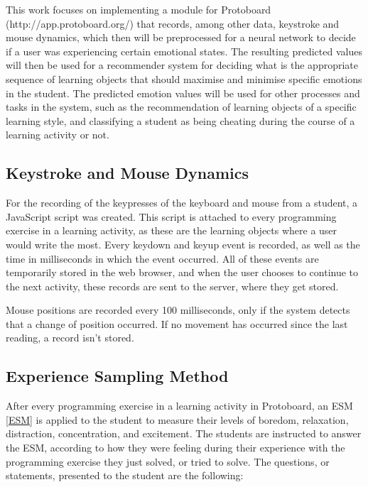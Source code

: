 \documentclass{acm_proc_article-sp}
\begin{document}
This work focuses on implementing a module for Protoboard (http://app.protoboard.org/) that
records, among other data, keystroke and mouse dynamics, which then
will be preprocessed for a neural network to decide if a user was
experiencing certain emotional states. The resulting predicted values
will then be used for a recommender system for deciding what is the
appropriate sequence of learning objects that should maximise and
minimise specific emotions in the student. The predicted emotion
values will be used for other processes and tasks in the system, such
as the recommendation of learning objects of a specific learning
style, and classifying a student as being cheating during the course
of a learning activity or not.


\subsection{Keystroke and Mouse Dynamics}

For the recording of the keypresses of the keyboard and mouse from a
student, a JavaScript script was created. This script is attached to
every programming exercise in a learning activity, as these are the
learning objects where a user would write the most. Every keydown and
keyup event is recorded, as well as the time in milliseconds in which the event
occurred. All of these events are temporarily stored in the web
browser, and when the user chooses to continue to the next activity,
these records are sent to the server, where they get stored.

Mouse positions are recorded every 100 milliseconds, only if the
system detects that a change of position occurred. If no movement has
occurred since the last reading, a record isn't stored.


\subsection{Experience Sampling Method}
\label{PM-ESM}

After every programming exercise in a learning activity in
Protoboard, an ESM \ref{ESM} is applied to the student to measure their levels
of boredom, relaxation, distraction, concentration, and
excitement. The students are instructed to answer the ESM,
according to how they were feeling during their experience with the
programming exercise they just solved, or tried to solve. The
questions, or statements, presented to the student are the following:
\end{document}
